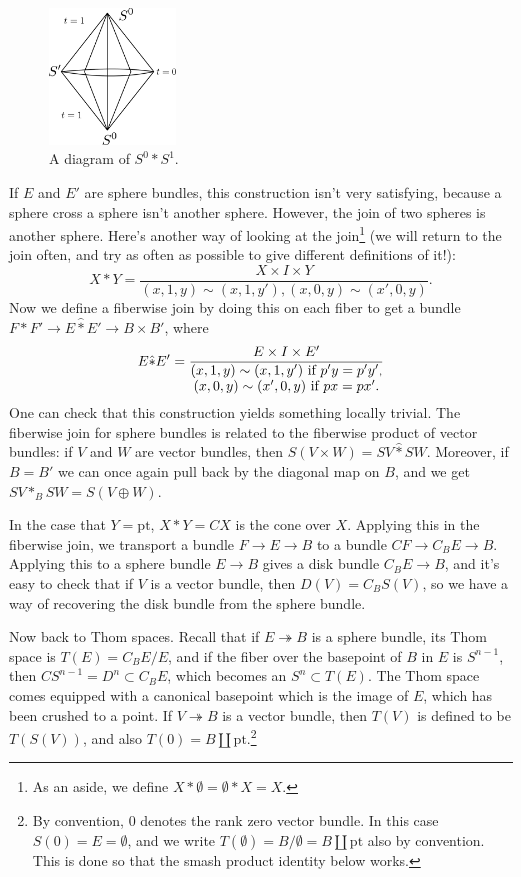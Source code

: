 \documentclass{article}
\newcommand{\ptspace}{\mathrm{pt}}
\newcommand{\onto}{\twoheadrightarrow}
\begin{document}
\begin{figure} %
\centering\includegraphics[width=0.3\textwidth]{figures/fig9.pdf}
\caption{\small A diagram of $S^0 \ast S^1$.}
\end{figure}
If $E$ and $E'$ are sphere bundles, this construction isn't very satisfying, because a sphere cross a sphere isn't another sphere.  However, the join of two spheres is another sphere.  Here's another way of looking at the join\footnote{As an aside, we define $X \ast \emptyset = \emptyset \ast X = X$.} (we will return to the join often, and try as often as possible to give different definitions of it!):
\[
X \ast Y = \frac{X \times I \times Y}{(x, 1, y) \sim (x, 1, y'), (x, 0, y) \sim (x', 0, y)}.
\]
Now we define a fiberwise join by doing this on each fiber to get a bundle $F \ast F' \to E \hat \ast E' \to B \times B'$, where \[E \hat \ast E' = \frac{E \times I \times E'}{\substack{\hbox{$(x, 1, y) \sim (x, 1, y')$ if $p'y = p'y'$}, \\ \hbox{$(x, 0, y) \sim (x', 0, y)$ if $px = px'$.}}}\]  One can check that this construction yields something locally trivial.  The fiberwise join for sphere bundles is related to the fiberwise product of vector bundles: if $V$ and $W$ are vector bundles, then $S(V \times W) = SV \hat \ast SW$.  Moreover, if $B = B'$ we can once again pull back by the diagonal map on $B$, and we get $SV \ast_B SW = S(V \oplus W)$.

In the case that $Y = \ptspace$, $X \ast Y = CX$ is the cone over $X$.  Applying this in the fiberwise join, we transport a bundle $F \to E \to B$ to a bundle $CF \to C_B E \to B$.  Applying this to a sphere bundle $E \to B$ gives a disk bundle $C_B E \to B$, and it's easy to check that if $V$ is a vector bundle, then $D(V) = C_B S(V)$, so we have a way of recovering the disk bundle from the sphere bundle.

Now back to Thom spaces.  Recall that if $E \onto B$ is a sphere bundle, its Thom space is $T(E) = C_B E / E$, and if the fiber over the basepoint of $B$ in $E$ is $S^{n-1}$, then $CS^{n-1} = D^n \subset C_B E$, which becomes an $S^n \subset T(E)$.  The Thom space comes equipped with a canonical basepoint which is the image of $E$, which has been crushed to a point.  If $V \onto B$ is a vector bundle, then $T(V)$ is defined to be $T(S(V))$, and also $T(0) = B \amalg \ptspace$.\footnote{By convention, $0$ denotes the rank zero vector bundle.  In this case $S(0) = E = \emptyset$, and we write $T(\emptyset) = B / \emptyset = B \amalg \ptspace$ also by convention.  This is done so that the smash product identity below works.}
\end{document}
